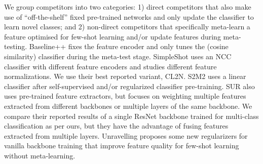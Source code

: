 \documentclass[10pt,twocolumn,letterpaper]{article}
\begin{document}
We group competitors into two categories: 1) direct competitors that also make use of ``off-the-shelf'' fixed pre-trained networks and only update the classifier to learn novel classes; and 2) non-direct competitors that specifically meta-learn a feature optimised for few-shot learning and/or update features during meta-testing. Baseline++ \cite{chen2019closerfewshot} fixes the feature encoder and only tunes the (cosine similarity) classifier during the meta-test stage. SimpleShot \cite{wang2019simpleshot} uses an NCC classifier with different feature encoders and studies different feature normalizations. We use their best reported variant, CL2N. 
S2M2 \cite{mangla2020charting} uses a linear classifier after self-supervised and/or regularized classifier pre-training. SUR \cite{dvornik2020selecting} also uses pre-trained feature extractors, but focuses on weighting multiple features extracted from different backbones or multiple layers of the same backbone. We compare their reported results of a single ResNet backbone trained for multi-class classification as per ours, but they have the advantage of fusing features extracted from multiple layers. 
Unravelling \cite{goldblum2020unraveling} proposes some new regularizers for vanilla backbone training that improve feature quality for few-shot learning without meta-learning.
\end{document}
